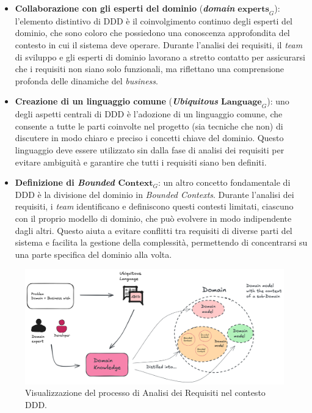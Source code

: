         \begin{itemize}
        \item \textbf{Collaborazione con gli esperti del dominio} (\textit{\textbf{domain} $\textbf{experts}_G$}): l’elemento distintivo di DDD è il coinvolgimento continuo degli esperti del dominio, che sono coloro che possiedono una conoscenza approfondita del contesto in cui il sistema deve operare. Durante l'analisi dei requisiti, il \textit{team} di sviluppo e gli esperti di dominio lavorano a stretto contatto per assicurarsi che i requisiti non siano solo funzionali, ma riflettano una comprensione profonda delle dinamiche del \textit{business}.

        \item \textbf{Creazione di un linguaggio comune} (\textit{\textbf{Ubiquitous} $\textbf{Language}_G$}): uno degli aspetti centrali di DDD è l’adozione di un linguaggio comune, che consente a tutte le parti coinvolte nel progetto (sia tecniche che non) di discutere in modo chiaro e preciso i concetti chiave del dominio. Questo linguaggio deve essere utilizzato sin dalla fase di analisi dei requisiti per evitare ambiguità e garantire che tutti i requisiti siano ben definiti.

        \item \textbf{Definizione di \textit{Bounded $\textbf{Context}_G$}}: un altro concetto fondamentale di DDD è la divisione del dominio in \textit{Bounded Contexts}. Durante l'analisi dei requisiti, i \textit{team} identificano e definiscono questi contesti limitati, ciascuno con il proprio modello di dominio, che può evolvere in modo indipendente dagli altri. Questo aiuta a evitare conflitti tra requisiti di diverse parti del sistema e facilita la gestione della complessità, permettendo di concentrarsi su una parte specifica del dominio alla volta.
        \end{itemize}

        \begin{figure} [H]
            \centering
            \includegraphics[width=0.9\linewidth]{BCS-Tessi/images/DDD_AR.png}
            \caption[Schema Analisi dei Requisiti nel contesto DDD]{Visualizzazione del processo di Analisi dei Requisiti nel contesto DDD.}
            \label{fig:AR-DDD}
        \end{figure}

